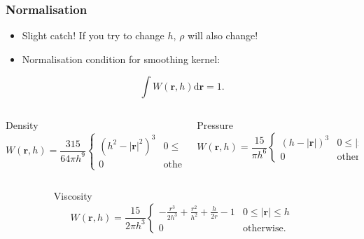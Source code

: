 \documentclass[aspectratio=169]{beamer}
\begin{document}
\begin{frame}
\frametitle{Normalisation}
\begin{itemize}
\item Slight catch! If you try to change \(h\), \(\rho\) will also change!
\item Normalisation condition for smoothing kernel:
\end{itemize}
\[
\int W\left(\mathbf{r}, h\right) \text{d}\mathbf{r} = 1.
\]

\begin{columns}
\begin{column}{0.45\textwidth}
\begin{block}{Density}
\vspace{-1em}
{\small\[
W\left(\mathbf{r}, h\right) = \frac{315}{64\pi h^9}
\begin{cases} 
    \left(h^2-\left|\mathbf{r}\right|^2\right)^3 & 0 \leq \left|\mathbf{r}\right| \leq h \\ 
    0 & \text{otherwise.}
\end{cases}
\]}
\end{block}
\end{column}


\begin{column}{0.45\textwidth}
\begin{block}{Pressure}
\vspace{-1em}
{\small\[
W\left(\mathbf{r}, h\right) = \frac{15}{\pi h^6}
\begin{cases} 
    \left(h-\left|\mathbf{r}\right|\right)^3 & 0 \leq \left|\mathbf{r}\right| \leq h \\ 
    0 & \text{otherwise.}
\end{cases}
\]}
\end{block}
\end{column}
\end{columns}


\begin{columns}
\begin{column}{0.18\textwidth}
\end{column}
\begin{column}{0.54\textwidth}
\begin{block}{Viscosity}
\vspace{-1em}
{\small\[
W\left(\mathbf{r}, h\right) = \frac{15}{2\pi h^3}
\begin{cases} 
    -\frac{r^3}{2h^3}+\frac{r^2}{h^2}+\frac{h}{2r}-1 & 0 \leq \left|\mathbf{r}\right| \leq h \\ 
    0 & \text{otherwise.}
\end{cases}
\]}
\end{block}
\end{column}
\begin{column}{0.18\textwidth}
\end{column}
\end{columns}
\end{frame}
\end{document}
